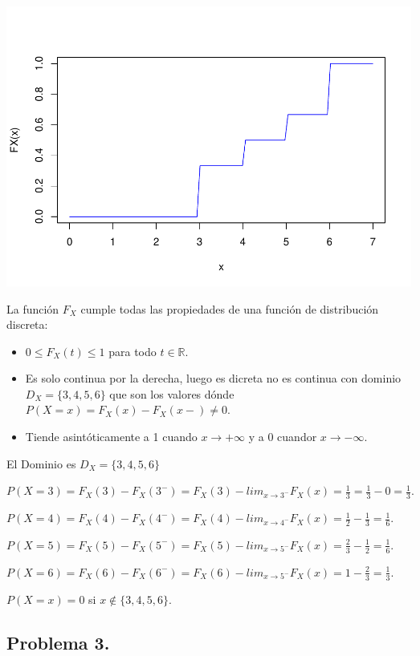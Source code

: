\documentclass[
]{article}
\providecommand{\tightlist}{%
  \setlength{\itemsep}{0pt}\setlength{\parskip}{0pt}}
\begin{document}
\includegraphics{Tema-2---Variables-Aleatorias_parte1_discretas_Soluciones_files/figure-latex/unnamed-chunk-2-1.pdf}

La función \(F_X\) cumple todas las propiedades de una función de
distribución discreta:

\begin{itemize}
\tightlist
\item
  \(0\leq F_X(t)\leq 1\) para todo \(t\in \mathbb{R}.\)
\item
  Es solo continua por la derecha, luego es dicreta no es continua con
  dominio \(D_X=\{3,4,5,6\}\) que son los valores dónde
  \(P(X=x)=F_X(x)-F_X(x-)\not=0\).
\item
  Tiende asintóticamente a 1 cuando \(x\to+\infty\) y a 0 cuandor
  \(x\to-\infty\).
\end{itemize}

El Dominio es \(D_X=\{3,4,5,6\}\)

\(P(X=3)=F_X(3)-F_X(3^{-})=F_X(3)-lim_{x\to 3^{-}} F_X(x)=\frac{1}{3}=\frac{1}{3}-0=\frac{1}{3}.\)

\(P(X=4)=F_X(4)-F_X(4^{-})=F_X(4)-lim_{x\to 4^{-}} F_X(x)=\frac{1}{2}-\frac{1}{3}=\frac{1}{6}.\)

\(P(X=5)=F_X(5)-F_X(5^{-})=F_X(5)-lim_{x\to 5^{-}} F_X(x)=\frac{2}{3}-\frac{1}{2}=\frac{1}{6}.\)

\(P(X=6)=F_X(6)-F_X(6^{-})=F_X(6)-lim_{x\to 5^{-}} F_X(x)=1-\frac{2}{3}=\frac{1}{3}.\)

\(P(X=x)=0\) si \(x \not\in\{3,4,5,6\}.\)

\hypertarget{problema-3.}{%
\subsection{Problema 3.}\label{problema-3.}}
\end{document}
